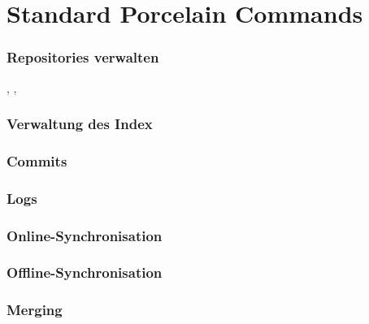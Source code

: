 \documentclass{cms-kurs}
\begin{document}
\section{Standard Porcelain Commands}

\begin{frame}
  \frametitle{Repositories verwalten}

  \onslide<+->

  , , 

\end{frame}

\begin{frame}
  \frametitle{Verwaltung des Index}

  \onslide<+->


\end{frame}

\begin{frame}
  \frametitle{Commits}

  \onslide<+->


\end{frame}

\begin{frame}
  \frametitle{Logs}

  \onslide<+->


\end{frame}

\begin{frame}
  \frametitle{Online-Synchronisation}

  \onslide<+->


\end{frame}

\begin{frame}
  \frametitle{Offline-Synchronisation}

  \onslide<+->


\end{frame}

\begin{frame}
  \frametitle{Merging}

  \onslide<+->


\end{frame}
\end{document}
